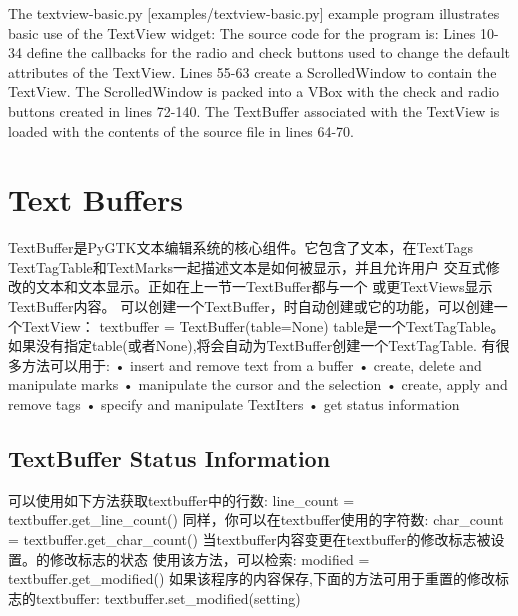 The textview-basic.py [examples/textview-basic.py] example program illustrates basic use of the TextView widget:
The source code for the program is:
Lines 10-34 define the callbacks for the radio and check buttons used to change the default attributes of the TextView.
Lines 55-63 create a ScrolledWindow to contain the TextView. The ScrolledWindow is packed into a VBox
with the check and radio buttons created in lines 72-140. The TextBuffer associated with the TextView is loaded
with the contents of the source file in lines 64-70.

\section{Text Buffers}
TextBuffer是PyGTK文本编辑系统的核心组件。它包含了文本，在TextTags
TextTagTable和TextMarks一起描述文本是如何被显示，并且允许用户
交互式修改的文本和文本显示。正如在上一节一TextBuffer都与一个
或更TextViews显示TextBuffer内容。
可以创建一个TextBuffer，时自动创建或它的功能，可以创建一个TextView：	
textbuffer = TextBuffer(table=None)
table是一个TextTagTable。如果没有指定table(或者None),将会自动为TextBuffer创建一个TextTagTable.
有很多方法可以用于:
• insert and remove text from a buffer
• create, delete and manipulate marks
• manipulate the cursor and the selection
• create, apply and remove tags
• specify and manipulate TextIters
• get status information
	\subsection{TextBuffer Status Information}
	可以使用如下方法获取textbuffer中的行数:
	line_count = textbuffer.get_line_count()
	同样，你可以在textbuffer使用的字符数:
	char_count = textbuffer.get_char_count()
	当textbuffer内容变更在textbuffer的修改标志被设置。的修改标志的状态
	使用该方法，可以检索:
	modified = textbuffer.get_modified()
	如果该程序的内容保存,下面的方法可用于重置的修改标志的textbuffer:
	textbuffer.set_modified(setting)
